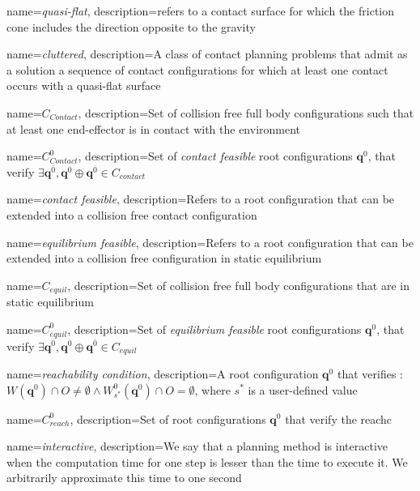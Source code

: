 {
  name=\textit{quasi-flat},
  description={refers to a contact surface for which the friction cone includes the direction opposite to the gravity}
}

{
  name=\textit{cluttered},
  description={A class of contact planning problems that admit as a solution a sequence of contact configurations for which at least one contact occurs with a \gls{quasi-flat} surface}
}

{
  name=$C_{Contact}$,
  description={Set of collision free full body configurations such that at least one end-effector is in contact with the environment}
}

{
  name=$C_{Contact}^0$,
  description={Set of \textit{contact feasible} root configurations $\mathbf{q}^{0}$, that verify $\exists \mathbf{q}^{\overline{0}},  \mathbf{q}^{0} \oplus \mathbf{q}^{\overline{0}} \in C_{contact}$}
}

{
  name=\textit{contact feasible},
  description={Refers to a root configuration that can be extended into a collision free contact configuration}
}

{
  name=\textit{equilibrium feasible},
  description={Refers to a root configuration that can be extended into a collision free configuration in static equilibrium}
}


{
  name=$C_{equil}$,
  description={Set of collision free full body configurations that are in static equilibrium}
}

{
  name=$C_{equil}^0$,
  description={Set of \textit{equilibrium feasible} root configurations $\mathbf{q}^{0}$, that verify $\exists \mathbf{q}^{\overline{0}},  \mathbf{q}^{0} \oplus \mathbf{q}^{\overline{0}} \in C_{equil}$}
}

{
  name=\textit{reachability condition},
  description={A root configuration $\mathbf{q}^{0}$ that verifies :\\ $W(\mathbf{q}^{0}) \cap O \neq \emptyset \wedge W^0_{s^*}(\mathbf{q}^{0}) \cap O = \emptyset$,
  where $s^*$ is a user-defined value}
}

{
  name=$C_{reach}^0$,
  description={Set of root configurations  $\mathbf{q}^{0}$ that verify the \gls{reachc}}
}

{
  name=\textit{interactive},
  description={We say that a planning method is interactive when the computation time for one step is lesser than the
time to execute it. We arbitrarily approximate this time to one second}
}

